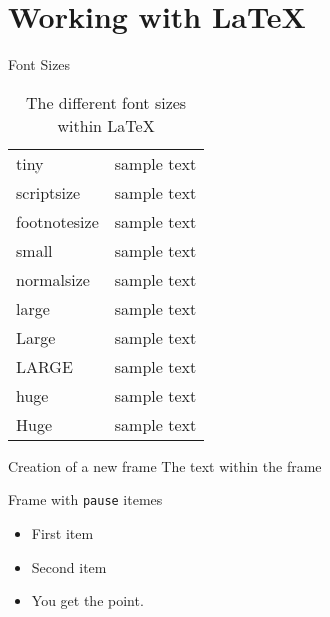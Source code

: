 
\section{Working with \LaTeX}
\begin{frame}{Font Sizes}
  \begin{table}[htdp]
\caption{The different font sizes within \LaTeX}
\begin{center}
\begin{tabular}{| l c |} \hline
 tiny			& {\tiny sample text}\\
 scriptsize		& {\scriptsize sample text}\\
 footnotesize	& {\footnotesize sample text}\\
 small		& {\small sample text}\\
 normalsize	& {\normalsize sample text}\\
 large		& {\large sample text}\\
 Large 		& {\Large sample text}\\
 LARGE 		& {\LARGE sample text}\\
 huge 		& {\huge sample text}\\
 Huge		& {\Huge sample text} \\\hline

\end{tabular}
\end{center}
\label{default}
\end{table}%
\end{frame}

\begin{frame}{Creation of a new frame}
The text within the frame
\end{frame}


% 
	
\begin{frame}{Frame with \texttt{pause} itemes}
	\begin{itemize} 
		\item First item \pause
		\item Second item \pause
		\item You get the point. 
	\end{itemize} 
\end{frame}


